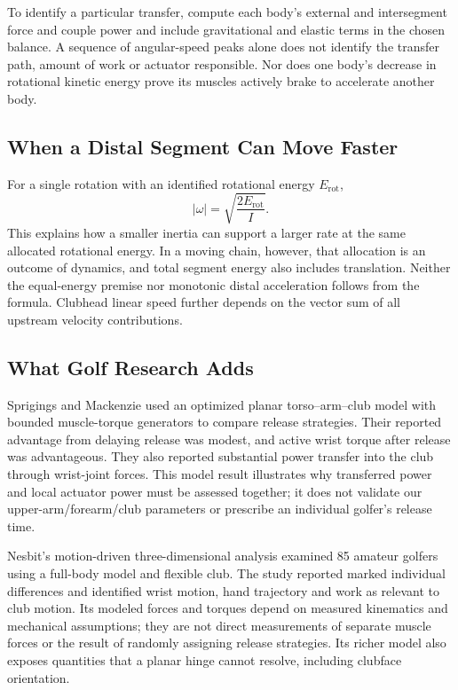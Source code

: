 To identify a particular transfer, compute each body's external and intersegment force and couple power and include gravitational and elastic terms in the chosen balance. A sequence of angular-speed peaks alone does not identify the transfer path, amount of work or actuator responsible. Nor does one body's decrease in rotational kinetic energy prove its muscles actively brake to accelerate another body.

\subsection{When a Distal Segment Can Move Faster}
\label{inplain:distal_faster_explanation}
\label{laymans:inplain:distal_faster_explanation}
For a single rotation with an identified rotational energy $E_{\mathrm{rot}}$,
\begin{equation}
|\omega|=\sqrt{\frac{2E_{\mathrm{rot}}}{I}}.
\label{eq:energy_velocity_relation}
\end{equation}
This explains how a smaller inertia can support a larger rate at the same allocated rotational energy. In a moving chain, however, that allocation is an outcome of dynamics, and total segment energy also includes translation. Neither the equal-energy premise nor monotonic distal acceleration follows from the formula. Clubhead linear speed further depends on the vector sum of all upstream velocity contributions.

\subsection{What Golf Research Adds}
Sprigings and Mackenzie used an optimized planar torso--arm--club model with bounded muscle-torque generators to compare release strategies. Their reported advantage from delaying release was modest, and active wrist torque after release was advantageous. They also reported substantial power transfer into the club through wrist-joint forces. This model result illustrates why transferred power and local actuator power must be assessed together; it does not validate our upper-arm/forearm/club parameters or prescribe an individual golfer's release time. \citep{SprigingsMackenzie2002Release}

Nesbit's motion-driven three-dimensional analysis examined 85 amateur golfers using a full-body model and flexible club. The study reported marked individual differences and identified wrist motion, hand trajectory and work as relevant to club motion. Its modeled forces and torques depend on measured kinematics and mechanical assumptions; they are not direct measurements of separate muscle forces or the result of randomly assigning release strategies. Its richer model also exposes quantities that a planar hinge cannot resolve, including clubface orientation. \citep{Nesbit2005}

